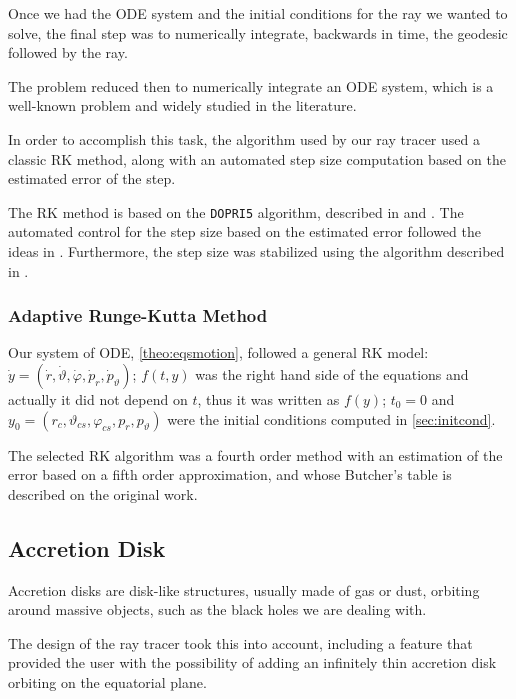 Once we had the \ac{ODE} system and the initial conditions for the ray we wanted to solve, the final step was to numerically integrate, backwards in time, the geodesic followed by the ray.

The problem reduced then to numerically integrate an \ac{ODE} system, which is a well-known problem and widely studied in the literature.

In order to accomplish this task, the algorithm used by our ray tracer used a classic \ac{RK} method, along with an automated step size computation based on the estimated error of the step.

The \ac{RK} method is based on the \texttt{DOPRI5} algorithm, described in \cite{hairer93} and \cite{hairer96}. The automated control for the step size based on the estimated error followed the ideas in \cite[Sec. II.4, Subsec. Automatic Step Size Control]{hairer93}. Furthermore, the step size was stabilized using the algorithm described in \cite[Sec. IV.2]{hairer96}.

\subsubsection*{Adaptive Runge-Kutta Method}

Our system of \ac{ODE}, \autoref{theo:eqsmotion}, followed a general \ac{RK} model: $\dot{y} = (\dot{r}, \dot{\vartheta}, \dot{\varphi}, \dot{p}_r, \dot{p}_\vartheta)$; $f(t,y)$ was the right hand side of the equations and actually it did not depend on $t$, thus it was written as $f(y)$; $t_0 = 0$ and $y_0 = (r_c, \vartheta_{cs}, \varphi_{cs}, p_{r}, p_{\vartheta})$ were the initial conditions computed in \autoref{sec:initcond}.

The selected \ac{RK} algorithm was a fourth order method with an estimation of the error based on a fifth order approximation, and whose Butcher's table is described on the original work.

\subsection{Accretion Disk}

Accretion disks are disk-like structures, usually made of gas or dust, orbiting around massive objects, such as the black holes we are dealing with.

The design of the ray tracer took this into account, including a feature that provided the user with the possibility of adding an infinitely thin accretion disk orbiting on the equatorial plane.

